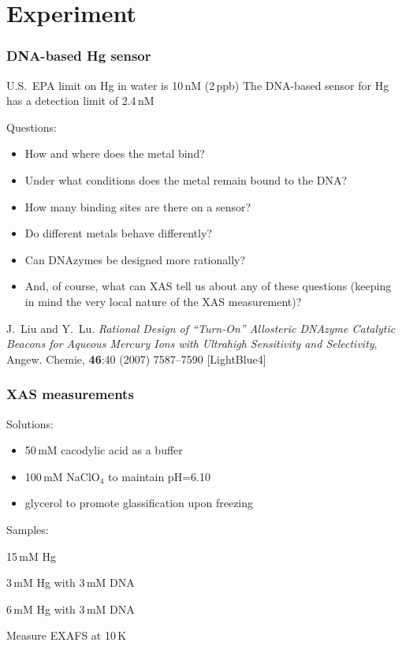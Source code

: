 \documentclass[10pt, xcolor=x11names, compress]{beamer}
\begin{document}
\section{Experiment}


\begin{frame}
  \frametitle{DNA-based Hg sensor}
  
  \begin{block}{U.S.\ EPA limit on Hg in water is 10\,nM (2\,ppb)}
    The DNA-based sensor for Hg has a detection limit of 2.4\,nM
  \end{block}

  Questions:
  \begin{itemize}
  \item How and where does the metal bind?
  \item Under what conditions does the metal remain bound to the
    DNA?
  \item How many binding sites are there on a sensor?
  \item Do different metals behave differently?
  \item Can DNAzymes be designed more rationally?
  \item And, of course, what can XAS tell us about any of these
    questions (keeping in mind the very local nature of the XAS
    measurement)?
  \end{itemize}


  \begin{bottomnote}[0.7][19]%
    J.\ Liu and Y.\ Lu. \textit{Rational Design of ``Turn-On''
      Allosteric DNAzyme Catalytic Beacons for Aqueous Mercury Ions
      with Ultrahigh Sensitivity and Selectivity}, Angew. Chemie,
    \textbf{46}:40 (2007) 7587--7590
    [LightBlue4]
  \end{bottomnote}
\end{frame}

\begin{frame}
  \frametitle{XAS measurements}
  Solutions:
  \begin{itemize}
  \item 50\,mM \alert{cacodylic acid} as a buffer
  \item 100\,mM NaClO$_4$ to maintain pH=6.10
  \item glycerol to promote glassification upon freezing
  \end{itemize}

  \bigskip

  Samples:
  \begin{description}[~~~Control]
  \item[~~~Control] 15\,mM Hg
  \item[~~~Sample] 3\,mM Hg with 3\,mM DNA
  \item[~~~Sample with excess Hg] 6\,mM Hg with 3\,mM DNA
  \end{description}

  \bigskip

  \begin{block}{}
    \centering Measure EXAFS at 10\,K
  \end{block}
\end{frame}
\end{document}

